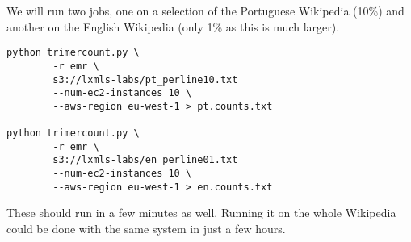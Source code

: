 We will run two jobs, one on a selection of the Portuguese Wikipedia (10\%) and
another on the English Wikipedia (only 1\% as this is much larger).

\begin{verbatim}
python trimercount.py \
        -r emr \
        s3://lxmls-labs/pt_perline10.txt
        --num-ec2-instances 10 \
        --aws-region eu-west-1 > pt.counts.txt

python trimercount.py \
        -r emr \
        s3://lxmls-labs/en_perline01.txt
        --num-ec2-instances 10 \
        --aws-region eu-west-1 > en.counts.txt
\end{verbatim}

These should run in a few minutes as well. Running it on the whole Wikipedia
could be done with the same system in just a few hours.

%
%
%
%
%
%
%


